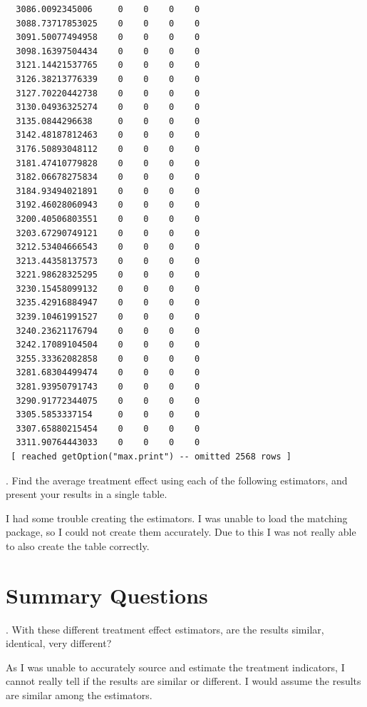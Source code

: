 \documentclass[
  letterpaper,
  DIV=11,
  numbers=noendperiod]{scrartcl}
\begin{document}
\begin{verbatim}
  3086.0092345006     0    0    0    0
  3088.73717853025    0    0    0    0
  3091.50077494958    0    0    0    0
  3098.16397504434    0    0    0    0
  3121.14421537765    0    0    0    0
  3126.38213776339    0    0    0    0
  3127.70220442738    0    0    0    0
  3130.04936325274    0    0    0    0
  3135.0844296638     0    0    0    0
  3142.48187812463    0    0    0    0
  3176.50893048112    0    0    0    0
  3181.47410779828    0    0    0    0
  3182.06678275834    0    0    0    0
  3184.93494021891    0    0    0    0
  3192.46028060943    0    0    0    0
  3200.40506803551    0    0    0    0
  3203.67290749121    0    0    0    0
  3212.53404666543    0    0    0    0
  3213.44358137573    0    0    0    0
  3221.98628325295    0    0    0    0
  3230.15458099132    0    0    0    0
  3235.42916884947    0    0    0    0
  3239.10461991527    0    0    0    0
  3240.23621176794    0    0    0    0
  3242.17089104504    0    0    0    0
  3255.33362082858    0    0    0    0
  3281.68304499474    0    0    0    0
  3281.93950791743    0    0    0    0
  3290.91772344075    0    0    0    0
  3305.5853337154     0    0    0    0
  3307.65880215454    0    0    0    0
  3311.90764443033    0    0    0    0
 [ reached getOption("max.print") -- omitted 2568 rows ]
\end{verbatim}

\newpage

. Find the average treatment effect using each of the
following estimators, and present your results in a single table.

I had some trouble creating the estimators. I was unable to load the
matching package, so I could not create them accurately. Due to this I
was not really able to also create the table correctly.

\newpage

\section{Summary Questions}\label{summary-questions}

\vspace{.2in}

. With these different treatment effect estimators, are the
results similar, identical, very different?

As I was unable to accurately source and estimate the treatment
indicators, I cannot really tell if the results are similar or
different. I would assume the results are similar among the estimators.
\end{document}
